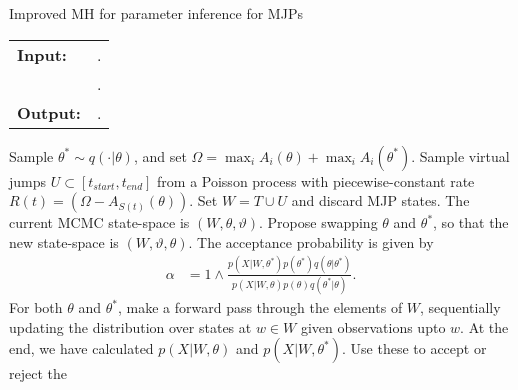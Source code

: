 \begin{algorithm}[H]
   \caption{Improved MH for parameter inference for MJPs }
   \label{alg:MH_improved}
  \begin{tabular}{l l}
   \textbf{Input:  } & \text{The observations $X$,}
                      \text{the previous MJP path $S(t) = (S, T)$ and parameters $\theta$}.\\ 
                     & \text{A  Metropolis-Hasting proposal $q(\cdot | \theta)$}.\\
   \textbf{Output:  }& \text{A new MJP trajectory $S'(t) = (S', T')$, 
                            new MJP parameters $\theta'$}.\\
   \hline
   \end{tabular}
   \begin{algorithmic}[1]
      \State Sample $\theta^* \sim q(\cdot| \theta)$, and 
      set $\Omega = \max_i A_i(\theta) + \max_i A_i(\theta^*)$. 
    \State Sample virtual jumps $U\subset[t_{start}, t_{end}]$ from a Poisson process with 
    piecewise-constant rate $R(t) = (\Omega - A_{S(t)}(\theta))$. 
    Set $W = T \cup U$ and discard MJP states.
    \State The current MCMC state-space is $(W,\theta,\vartheta)$. Propose swapping
    $\theta$ and $\theta^*$, so that the new state-space is 
    $(W, \vartheta, \theta)$. The acceptance probability is given by
        \begin{align*}
        \alpha %
        &=  1 \wedge \frac{p(X| W,\theta^*)p(\theta^*)q(\theta|\theta^*)}
        {p(X| W,\theta)p(\theta) q(\theta^*|\theta)}.
        \end{align*}
    \State For both $\theta$ and $\theta^*$, make a forward pass through the 
    elements of $W$, sequentially updating the distribution over states at 
    $w \in W$ given observations upto $w$. At the end, we have calculated
    $p(X|W,\theta)$ and $p(X|W,\theta^*)$. Use these to accept or reject the

\end{algorithmic}
\end{algorithm}
